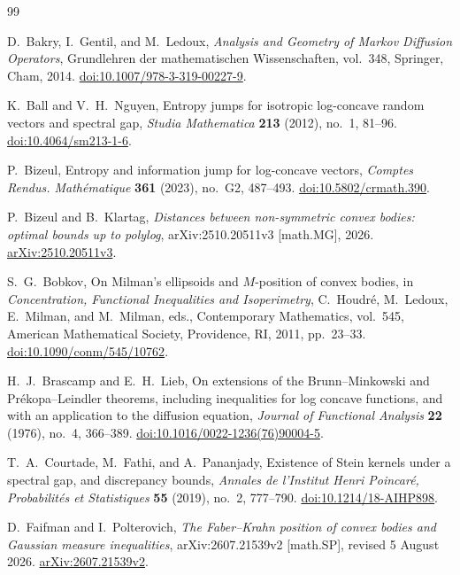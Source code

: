 \documentclass[11pt]{amsart}
\numberwithin{equation}{section}
\theoremstyle{definition}
\theoremstyle{remark}
\begin{document}
\begin{thebibliography}{99}

D.~Bakry, I.~Gentil, and M.~Ledoux,
\emph{Analysis and Geometry of Markov Diffusion Operators},
Grundlehren der mathematischen Wissenschaften, vol.~348,
Springer, Cham, 2014.
\href{https://doi.org/10.1007/978-3-319-00227-9}
{doi:10.1007/978-3-319-00227-9}.

K.~Ball and V.~H.~Nguyen,
Entropy jumps for isotropic log-concave random vectors and spectral gap,
\emph{Studia Mathematica} \textbf{213} (2012), no.~1, 81--96.
\href{https://doi.org/10.4064/sm213-1-6}
{doi:10.4064/sm213-1-6}.

P.~Bizeul,
Entropy and information jump for log-concave vectors,
\emph{Comptes Rendus. Math\'ematique} \textbf{361} (2023), no.~G2,
487--493.
\href{https://doi.org/10.5802/crmath.390}
{doi:10.5802/crmath.390}.

P.~Bizeul and B.~Klartag,
\emph{Distances between non-symmetric convex bodies: optimal bounds up to polylog},
arXiv:2510.20511v3 [math.MG], 2026.
\href{https://arxiv.org/abs/2510.20511v3}{arXiv:2510.20511v3}.

S.~G.~Bobkov,
On Milman's ellipsoids and \(M\)-position of convex bodies,
in \emph{Concentration, Functional Inequalities and Isoperimetry},
C.~Houdr\'e, M.~Ledoux, E.~Milman, and M.~Milman, eds.,
Contemporary Mathematics, vol.~545,
American Mathematical Society, Providence, RI, 2011, pp.~23--33.
\href{https://doi.org/10.1090/conm/545/10762}
{doi:10.1090/conm/545/10762}.

H.~J.~Brascamp and E.~H.~Lieb,
On extensions of the Brunn--Minkowski and Pr\'ekopa--Leindler theorems,
including inequalities for log concave functions, and with an
application to the diffusion equation,
\emph{Journal of Functional Analysis} \textbf{22} (1976), no.~4,
366--389.
\href{https://doi.org/10.1016/0022-1236(76)90004-5}
{doi:10.1016/0022-1236(76)90004-5}.

T.~A.~Courtade, M.~Fathi, and A.~Pananjady,
Existence of Stein kernels under a spectral gap, and discrepancy bounds,
\emph{Annales de l'Institut Henri Poincar\'e, Probabilit\'es et Statistiques}
\textbf{55} (2019), no.~2, 777--790.
\href{https://doi.org/10.1214/18-AIHP898}{doi:10.1214/18-AIHP898}.

D.~Faifman and I.~Polterovich,
\emph{The Faber--Krahn position of convex bodies and Gaussian measure
inequalities},
arXiv:2607.21539v2 [math.SP], revised 5 August 2026.
\href{https://arxiv.org/abs/2607.21539v2}
{arXiv:2607.21539v2}.


\end{thebibliography}
\end{document}
